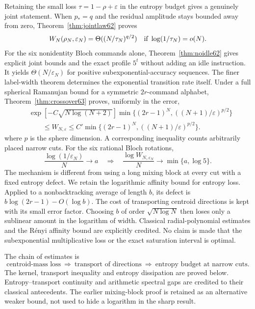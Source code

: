 Retaining the small loss $\tau=1-\rho+\varepsilon$ in the entropy
budget gives a genuinely joint statement. When $p_*=q$ and the residual
amplitude stays bounded away from zero, Theorem~\ref{thm:jointlaw62}
proves
\[
 W_N(\rho_N,\varepsilon_N)=\Theta((N/\tau_N)^{q/2})
 \quad\hbox{if }\log(1/\tau_N)=o(N).
\]
For the six nonidentity Bloch commands alone,
Theorem~\ref{thm:noidle62} gives explicit joint bounds and the exact
profile $5^t$ without adding an idle instruction. It yields
$\Theta(N/\varepsilon_N)$ for positive subexponential-accuracy sequences.
The finer label-width theorem determines the exponential transition rate itself.
Under a full spherical Ramanujan bound for a symmetric $2r$-command
alphabet, Theorem~\ref{thm:crossover63} proves, uniformly in the error,
\[
 \begin{split}
 &\exp[-C\sqrt{N\log(N+2)}]
      \min\{(2r-1)^N,((N+1)/\varepsilon)^{p/2}\}\\
 &\hspace{2em}\le W_{N,\varepsilon}
      \le C'\min\{(2r-1)^N,((N+1)/\varepsilon)^{p/2}\}.
 \end{split}
\]
where $p$ is the sphere dimension. A corresponding inequality counts
arbitrarily placed narrow cuts. For the six rational Bloch rotations,
\[
 \frac{\log(1/\varepsilon_N)}N\longrightarrow a
 \quad\Longrightarrow\quad
 \frac{\log W_{N,\varepsilon_N}}N\longrightarrow\min\{a,\log5\}.
\]
The mechanism is different from using a long mixing block at every
cut with a fixed entropy defect. We retain the logarithmic affinity
bound for entropy loss. Applied to a nonbacktracking average of length
$b$, its defect is $b\log(2r-1)-O(\log b)$. The cost of transporting
centroid directions is kept with its small error factor. Choosing
$b$ of order $\sqrt{N\log N}$ then loses only a sublinear amount in
the logarithm of width. Classical radial-polynomial estimates and the
R\'enyi affinity bound are explicitly credited. No claim is made that
the subexponential multiplicative loss or the exact saturation interval
is optimal.

The chain of estimates is
\[
 \text{centroid-mass loss}\ \Longrightarrow\
 \text{transport of directions}\ \Longrightarrow\
 \text{entropy budget at narrow cuts}.
\]
The kernel, transport inequality and entropy dissipation are proved
below. Entropy--transport continuity and arithmetic spectral gaps are
credited to their classical antecedents. The earlier mixing-block proof
is retained as an alternative weaker bound, not used to hide a
logarithm in the sharp result.

